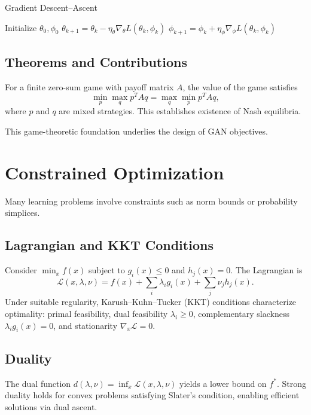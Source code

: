 \begin{algorithm}
\caption{Gradient Descent--Ascent}
\begin{algorithmic}[1]
\STATE Initialize $\theta_0, \phi_0$
    \STATE $\theta_{k+1}=\theta_k-\eta_\theta\nabla_{\theta}L(\theta_k,\phi_k)$
    \STATE $\phi_{k+1}=\phi_k+\eta_\phi\nabla_{\phi}L(\theta_k,\phi_k)$
\ENDFOR
\end{algorithmic}
\end{algorithm}

\subsection{Theorems and Contributions}
\begin{theorem}
For a finite zero-sum game with payoff matrix $A$, the value of the game satisfies
\begin{equation}
\min_{p}\max_{q} p^T A q = \max_{q}\min_{p} p^T A q,
\end{equation}
where $p$ and $q$ are mixed strategies. This establishes existence of Nash equilibria.
\end{theorem}
This game-theoretic foundation underlies the design of GAN objectives.

\section{Constrained Optimization}
Many learning problems involve constraints such as norm bounds or probability simplices.
\subsection{Lagrangian and KKT Conditions}
Consider $\min_x f(x)$ subject to $g_i(x)\le0$ and $h_j(x)=0$. The Lagrangian is
\begin{equation}
\mathcal{L}(x,\lambda,\nu)=f(x)+\sum_i \lambda_i g_i(x)+\sum_j \nu_j h_j(x).
\end{equation}
Under suitable regularity, Karush--Kuhn--Tucker (KKT) conditions characterize optimality: primal feasibility, dual feasibility $\lambda_i\ge0$, complementary slackness $\lambda_i g_i(x)=0$, and stationarity $\nabla_x \mathcal{L}=0$.
\subsection{Duality}
The dual function $d(\lambda,\nu)=\inf_x \mathcal{L}(x,\lambda,\nu)$ yields a lower bound on $f^*$. Strong duality holds for convex problems satisfying Slater's condition, enabling efficient solutions via dual ascent.


